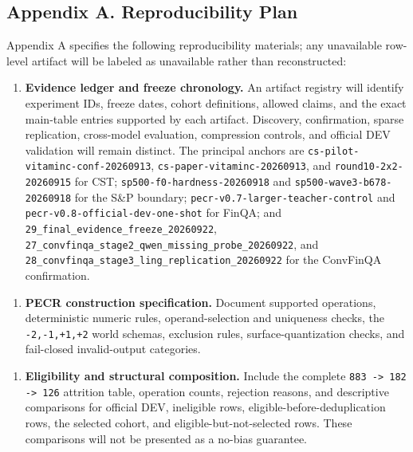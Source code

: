 \documentclass[11pt]{article}
\begin{document}
\subsection{Appendix A. Reproducibility Plan}

Appendix A specifies the following reproducibility materials; any unavailable row-level artifact will be labeled as unavailable rather than reconstructed:

\begin{enumerate}
  \item \textbf{Evidence ledger and freeze chronology.} An artifact registry will identify experiment IDs, freeze dates, cohort definitions, allowed claims, and the exact main-table entries supported by each artifact. Discovery, confirmation, sparse replication, cross-model evaluation, compression controls, and official DEV validation will remain distinct. The principal anchors are \texttt{cs-pilot-vitaminc-conf-20260913}, \texttt{cs-paper-vitaminc-20260913}, and \texttt{round10-2x2-20260915} for CST; \texttt{sp500-f0-hardness-20260918} and \texttt{sp500-wave3-b678-20260918} for the S\&P boundary; \texttt{pecr-v0.7-larger-teacher-control} and \texttt{pecr-v0.8-official-dev-one-shot} for FinQA; and \texttt{29\_final\_evidence\_freeze\_20260922}, \texttt{27\_convfinqa\_stage2\_qwen\_missing\_probe\_20260922}, and \texttt{28\_convfinqa\_stage3\_ling\_replication\_20260922} for the ConvFinQA confirmation.
\end{enumerate}

\begin{enumerate}
  \item \textbf{PECR construction specification.} Document supported operations, deterministic numeric rules, operand-selection and uniqueness checks, the \texttt{-2,-1,+1,+2} world schemas, exclusion rules, surface-quantization checks, and fail-closed invalid-output categories.
\end{enumerate}

\begin{enumerate}
  \item \textbf{Eligibility and structural composition.} Include the complete \texttt{883 -> 182 -> 126} attrition table, operation counts, rejection reasons, and descriptive comparisons for official DEV, ineligible rows, eligible-before-deduplication rows, the selected cohort, and eligible-but-not-selected rows. These comparisons will not be presented as a no-bias guarantee.
\end{enumerate}
\end{document}
